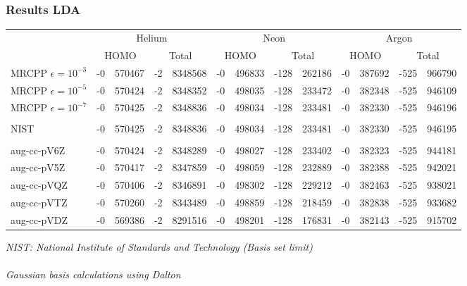 \documentclass[slides]{beamer}
\begin{document}
\begin{frame}
	\frametitle{Results LDA}
	\begin{table}
		\tiny
		\centering
		\begin{tabular}{|l|r@{.}lr@{.}l|r@{.}lr@{.}l|r@{.}lr@{.}l|}
			\hline&
			\multicolumn{4}{c|}{Helium}&
			\multicolumn{4}{c|}{Neon}&
			\multicolumn{4}{c|}{Argon}\\
			&
			\multicolumn{2}{c}{HOMO}&
			\multicolumn{2}{c|}{Total}&
			\multicolumn{2}{c}{HOMO}&
			\multicolumn{2}{c|}{Total}&
			\multicolumn{2}{c}{HOMO}&
			\multicolumn{2}{c|}{Total}\\
			\hline
			MRCPP $\epsilon=10^{-3}$&
			  -0&570467&
			  -2&8348568&
			  -0&496833&
			-128&262186&
			  -0&387692&
			-525&966790\\
			MRCPP $\epsilon=10^{-5}$&
			  -0&570424&
			  -2&8348352&
			  -0&498035&
			-128&233472&
			  -0&382348&
			-525&946109\\
			MRCPP $\epsilon=10^{-7}$&
			  -0&570425&
			  -2&8348836&
			  -0&498034&
			-128&233481&
			  -0&382330&
			-525&946196\\
			\hline
			&\multicolumn{4}{c|}{}&
			\multicolumn{4}{c|}{}&
			\multicolumn{4}{c|}{}\\
			NIST&
			  -0&570425&
			  -2&8348836&
			  -0&498034&
			-128&233481&
			  -0&382330&
			-525&946195\\
			&\multicolumn{4}{c|}{}&
			\multicolumn{4}{c|}{}&
			\multicolumn{4}{c|}{}\\
			\hline
			aug-cc-pV6Z&
			  -0&570424&
			  -2&8348289&
			  -0&498027&
			-128&233402&
			  -0&382323&
			-525&944181\\
			aug-cc-pV5Z&
			  -0&570417&
			  -2&8347859&
			  -0&498059&
			-128&232889&
			  -0&382388&
			-525&942021\\
			aug-cc-pVQZ&
			  -0&570406&
			  -2&8346891&
			  -0&498302&
			-128&229212&
			  -0&382463&
			-525&938021\\
			aug-cc-pVTZ&
			  -0&570260&
			  -2&8343489&
			  -0&498859&
			-128&218459&
			  -0&382838&
			-525&933682\\
			aug-cc-pVDZ&
			  -0&569386&
			  -2&8291516&
			  -0&498201&
			-128&176831&
			  -0&382143&
			-525&915702\\
			\hline
		\end{tabular}
	\end{table}
	\tiny
	\it{NIST: National Institute of Standards and Technology (Basis set limit)}\\
	\ \\
	\it{Gaussian basis calculations using Dalton}\\
\end{frame}
\end{document}
